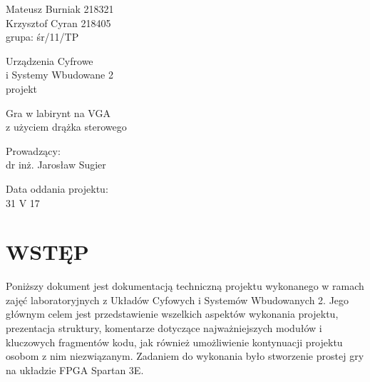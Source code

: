 \documentclass[11pt]{article}
\begin{document}
\thispagestyle{empty}

\noindent
Mateusz Burniak 218321 \\
Krzysztof Cyran 218405 \\
grupa: śr/11/TP

\vfill

\begin{center}
  \begin{Huge}
    Urządzenia Cyfrowe \\
    i Systemy Wbudowane 2 \\
    \vspace{.5cm}
    projekt
  \end{Huge}
  
  \vspace{3cm}
  
  \begin{Large}
    Gra w labirynt na VGA \\
    z użyciem drążka sterowego
  \end{Large}
  
  \vspace{3cm}
  
  \begin{Large}
    Prowadzący: \\
    dr inż. Jarosław Sugier
  \end{Large}
  
  \vspace{3cm}
  
  Data oddania projektu: \\
  31 V 17
  
\end{center}

\vfill

\newpage

\tableofcontents

\newpage


\section{WSTĘP}

Poniższy dokument jest dokumentacją techniczną projektu wykonanego w ramach zajęć laboratoryjnych z Układów Cyfowych i Systemów Wbudowanych 2. 
Jego głównym celem jest przedstawienie wszelkich aspektów wykonania projektu, prezentacja struktury, komentarze dotyczące najważniejszych modułów i kluczowych fragmentów kodu, jak również umożliwienie kontynuacji projektu osobom z nim niezwiązanym. 
Zadaniem do wykonania było stworzenie prostej gry na układzie FPGA Spartan 3E.
\end{document}
